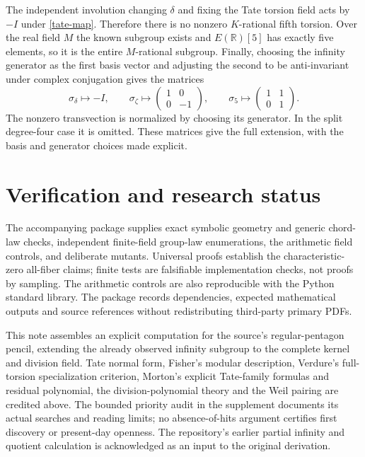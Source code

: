 \documentclass[11pt]{article}
\begin{document}
The independent involution changing $\delta$ and fixing the Tate
torsion field acts by $-I$ under \eqref{tate-map}. Therefore there is
no nonzero $K$-rational fifth torsion. Over the real field $M$ the
known subgroup exists and $E(\mathbb R)[5]$ has exactly five elements,
so it is the entire $M$-rational subgroup. Finally, choosing the
infinity generator as the first basis vector and adjusting the second
to be anti-invariant under complex conjugation gives the matrices
\[
\sigma_\delta\mapsto-I,\qquad
\sigma_\zeta\mapsto\begin{pmatrix}1&0\\0&-1\end{pmatrix},\qquad
\sigma_5\mapsto\begin{pmatrix}1&1\\0&1\end{pmatrix}.
\]
The nonzero transvection is normalized by choosing its generator. In
the split degree-four case it is omitted. These matrices give the
full extension, with the basis and generator choices made explicit.

\section{Verification and research status}
The accompanying package supplies exact symbolic geometry and
generic chord-law checks, independent finite-field group-law
enumerations, the arithmetic field controls, and deliberate mutants.
Universal proofs establish the characteristic-zero all-fiber claims;
finite tests are falsifiable implementation checks, not proofs by
sampling. The arithmetic controls are also reproducible with the
Python standard library. The package records dependencies, expected
mathematical outputs and source references without redistributing
third-party primary PDFs.

This note assembles an explicit computation for the source's
regular-pentagon pencil, extending the already observed infinity
subgroup to the complete kernel and division field. Tate normal form,
Fisher's modular description, Verdure's full-torsion specialization
criterion, Morton's explicit Tate-family formulas
and residual polynomial, the division-polynomial theory and the
Weil pairing are credited above. The bounded priority audit in the
supplement documents its actual searches and reading limits; no
absence-of-hits argument certifies first discovery or present-day
openness. The repository's earlier partial infinity and quotient
calculation is acknowledged as an input to the original derivation.
\end{document}
